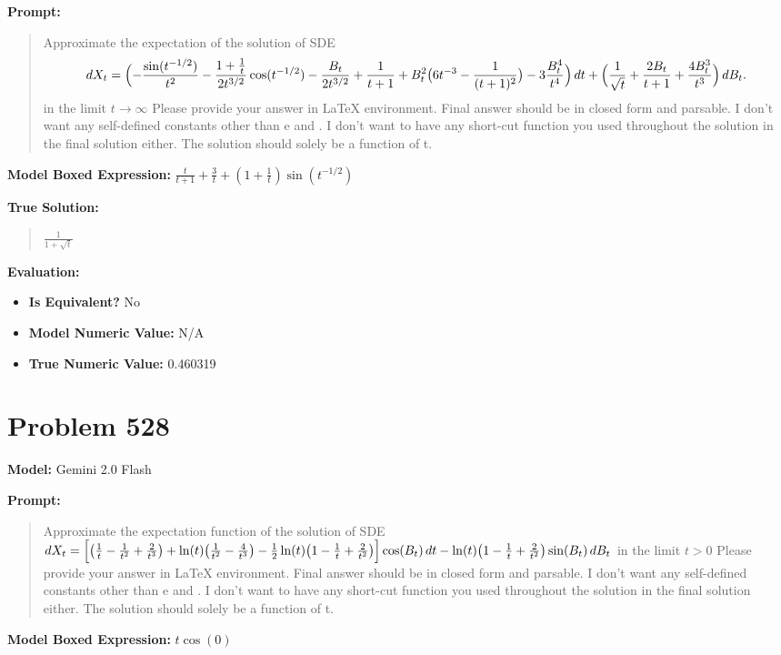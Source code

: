 \documentclass{article}
\begin{document}
\textbf{Prompt:}
\begin{quote}
Approximate the expectation of the solution of SDE $$dX_t = \Bigl(-\frac{\sin(t^{-1/2})}{t^2}-\frac{1+\tfrac1t}{2t^{3/2}}\cos(t^{-1/2})-\frac{B_t}{2t^{3/2}}+\frac1{t+1}+B_t^2\bigl(6t^{-3}-\frac1{(t+1)^2}\bigr)-3\frac{B_t^4}{t^4}\Bigr)\,dt + \Bigl(\frac1{\sqrt t}+\frac{2B_t}{t+1}+\frac{4B_t^3}{t^3}\Bigr)\,dB_t.$$ in the limit $t \to \infty$ Please provide your answer in LaTeX \boxed{} environment. Final answer should be in closed form and parsable. I don't want any self-defined constants other than e and \pi. I don't want to have any short-cut function you used throughout the solution in the final solution either. The solution should solely be a function of t.
\end{quote}
\textbf{Model Boxed Expression:} $\frac{t}{t+1} + \frac{3}{t} + (1+\frac1t)\sin(t^{-1/2})$

\textbf{True Solution:}
\begin{quote}
$\frac{1}{1 + \sqrt{t}}$
\end{quote}

\textbf{Evaluation:}
\begin{itemize}
\item \textbf{Is Equivalent?} No
\item \textbf{Model Numeric Value:} N/A
\item \textbf{True Numeric Value:} 0.460319
\end{itemize}
\vspace{1cm}
\section*{Problem 528}
\textbf{Model:} Gemini 2.0 Flash

\textbf{Prompt:}
\begin{quote}
Approximate the expectation function of the solution of SDE $dX_t = \Bigl[\bigl(\frac1t-\frac1{t^2}+\frac2{t^3}\bigr)+\ln(t)\bigl(\frac1{t^2}-\frac4{t^3}\bigr)-\tfrac12\ln(t)\bigl(1-\frac1t+\frac2{t^2}\bigr)\Bigr]\cos(B_t)\,dt - \ln(t)\bigl(1-\frac1t+\frac2{t^2}\bigr)\sin(B_t)\,dB_t$ in the limit $ t > 0$ Please provide your answer in LaTeX \boxed{} environment. Final answer should be in closed form and parsable. I don't want any self-defined constants other than e and \pi. I don't want to have any short-cut function you used throughout the solution in the final solution either. The solution should solely be a function of t.
\end{quote}
\textbf{Model Boxed Expression:} $t\cos(0)$
\end{document}
